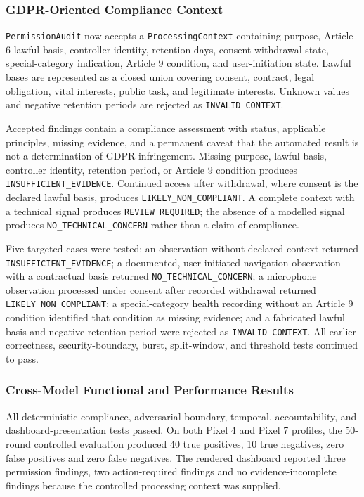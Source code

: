 \subsubsection{GDPR-Oriented Compliance Context}

\texttt{PermissionAudit} now accepts a \texttt{ProcessingContext} containing purpose, Article 6 lawful basis, controller identity, retention days, consent-withdrawal state, special-category indication, Article 9 condition, and user-initiation state. Lawful bases are represented as a closed union covering consent, contract, legal obligation, vital interests, public task, and legitimate interests. Unknown values and negative retention periods are rejected as \texttt{INVALID\_CONTEXT}.

Accepted findings contain a compliance assessment with status, applicable principles, missing evidence, and a permanent caveat that the automated result is not a determination of GDPR infringement. Missing purpose, lawful basis, controller identity, retention period, or Article 9 condition produces \texttt{INSUFFICIENT\_EVIDENCE}. Continued access after withdrawal, where consent is the declared lawful basis, produces \texttt{LIKELY\_NON\_COMPLIANT}. A complete context with a technical signal produces \texttt{REVIEW\_REQUIRED}; the absence of a modelled signal produces \texttt{NO\_TECHNICAL\_CONCERN} rather than a claim of compliance.

Five targeted cases were tested: an observation without declared context returned \texttt{INSUFFICIENT\_EVIDENCE}; a documented, user-initiated navigation observation with a contractual basis returned \texttt{NO\_TECHNICAL\_CONCERN}; a microphone observation processed under consent after recorded withdrawal returned \texttt{LIKELY\_NON\_COMPLIANT}; a special-category health recording without an Article 9 condition identified that condition as missing evidence; and a fabricated lawful basis and negative retention period were rejected as \texttt{INVALID\_CONTEXT}. All earlier correctness, security-boundary, burst, split-window, and threshold tests continued to pass.

\subsubsection{Cross-Model Functional and Performance Results}

All deterministic compliance, adversarial-boundary, temporal, accountability, and dashboard-presentation tests passed. On both Pixel 4 and Pixel 7 profiles, the 50-round controlled evaluation produced 40 true positives, 10 true negatives, zero false positives and zero false negatives. The rendered dashboard reported three permission findings, two action-required findings and no evidence-incomplete findings because the controlled processing context was supplied.

